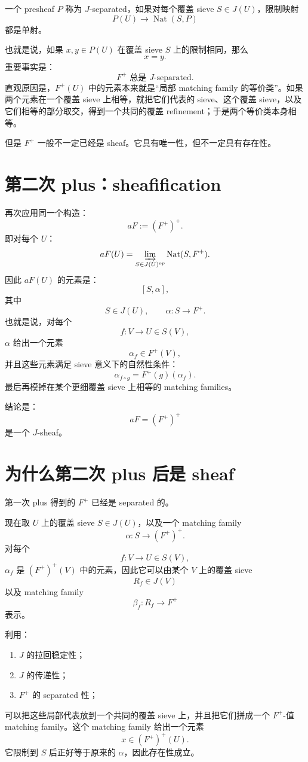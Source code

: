 \documentclass[12pt,a4paper]{article}
\begin{document}
一个 presheaf \(P\) 称为 \(J\)-separated，如果对每个覆盖 sieve \(S\in J(U)\)，限制映射
\[
P(U)\longrightarrow \operatorname{Nat}(S,P)
\]
都是单射。

也就是说，如果 \(x,y\in P(U)\) 在覆盖 sieve \(S\) 上的限制相同，那么
\[
x=y.
\]
重要事实是：
\[
F^+\text{ 总是 }J\text{-separated}.
\]
直观原因是，\(F^+(U)\) 中的元素本来就是“局部 matching family 的等价类”。如果两个元素在一个覆盖 sieve 上相等，就把它们代表的 sieve、这个覆盖 sieve，以及它们相等的部分取交，得到一个共同的覆盖 refinement；于是两个等价类本身相等。

但是 \(F^+\) 一般不一定已经是 sheaf。它具有唯一性，但不一定具有存在性。

\section{第二次 plus：sheafification}

再次应用同一个构造：
\[
aF:=(F^+)^+.
\]
即对每个 \(U\)：
\[
aF(U)
=
\varinjlim_{S\in J(U)^{op}}
\operatorname{Nat}(S,F^+).
\]
因此 \(aF(U)\) 的元素是：
\[
[S,\alpha],
\]
其中
\[
S\in J(U),\qquad
\alpha:S\to F^+.
\]
也就是说，对每个
\[
f:V\to U\in S(V),
\]
\(\alpha\) 给出一个元素
\[
\alpha_f\in F^+(V),
\]
并且这些元素满足 sieve 意义下的自然性条件：
\[
\alpha_{f\circ g}=F^+(g)(\alpha_f).
\]
最后再模掉在某个更细覆盖 sieve 上相等的 matching families。

结论是：
\[
\boxed{aF=(F^+)^+}
\]
是一个 \(J\)-sheaf。

\section{为什么第二次 plus 后是 sheaf}

第一次 plus 得到的 \(F^+\) 已经是 separated 的。

现在取 \(U\) 上的覆盖 sieve \(S\in J(U)\)，以及一个 matching family
\[
\alpha:S\to (F^+)^+.
\]
对每个
\[
f:V\to U\in S(V),
\]
\(\alpha_f\) 是 \((F^+)^+(V)\) 中的元素，因此它可以由某个 \(V\) 上的覆盖 sieve
\[
R_f\in J(V)
\]
以及 matching family
\[
\beta_f:R_f\to F^+
\]
表示。

利用：
\begin{enumerate}[label=\arabic*.]
\item \(J\) 的拉回稳定性；
\item \(J\) 的传递性；
\item \(F^+\) 的 separated 性；
\end{enumerate}
可以把这些局部代表放到一个共同的覆盖 sieve 上，并且把它们拼成一个 \(F^+\)-值 matching family。这个 matching family 给出一个元素
\[
x\in (F^+)^+(U).
\]
它限制到 \(S\) 后正好等于原来的 \(\alpha\)，因此存在性成立。
\end{document}
